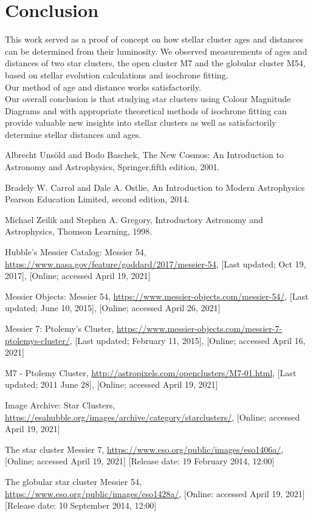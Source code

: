 \documentclass[12pt]{article}
\begin{document}
		\section{Conclusion}
		This work served as a proof of concept on how stellar cluster ages and distances can be determined from their luminosity. We observed measurements of ages and distances of two star clusters, the open cluster M7 and the globular cluster M54, based on stellar evolution calculations and isochrone fitting.\\
		Our method of age and distance works satisfactorily.\\
		Our overall conclusion is that studying star clusters using Colour Magnitude Diagrams and with appropriate theoretical methods of isochrone fitting can provide valuable new insights into stellar clusters as well as satisfactorily determine stellar distances and ages.
		
	\pagebreak
	\begin{thebibliography}{}
		
		{Albrecht Uns\"{o}ld and Bodo Baschek},
		{The New Cosmos: An Introduction to Astronomy and Astrophysics},
		{Springer},{fifth edition}, 2001.
		
		{Bradely W. Carrol and Dale A. Ostlie},
		{An Introduction to Modern Astrophysics}
		{Pearson Education Limited},
		{second edition}, 2014.
		
		{Michael Zeilik and Stephen A. Gregory},
		{Introductory Astronomy and Astrophysics},
		{Thomson Learning}, 1998.
		
		{Hubble's Messier Catalog: Messier 54},
		{\url{https://www.nasa.gov/feature/goddard/2017/messier-54}},
		{[Last updated; Oct 19, 2017]},
		{[Online; accessed April 19, 2021]}
		
		{Messier Objects: Messier 54},
		{\url{https://www.messier-objects.com/messier-54/}},
		{[Last updated; June 10, 2015]},
		{[Online; accessed April 26, 2021]}
		
		{Messier 7: Ptolemy's Cluster},
		{\url{https://www.messier-objects.com/messier-7-ptolemys-cluster/}},
		{[Last updated; February 11, 2015]},
		{[Online; accessed April 16, 2021]}
		
		{M7 - Ptolemy Cluster},
		{\url{http://astropixels.com/openclusters/M7-01.html}},
		{[Last updated; 2011 June 28]},
		{[Online; accessed April 19, 2021]}
		
		{Image Archive: Star Clusters},
		{\url{https://esahubble.org/images/archive/category/starclusters/}},
		{[Online; accessed April 19, 2021]}
		
		{The star cluster Messier 7},
		{\url{https://www.eso.org/public/images/eso1406a/}},
		{[Online; accessed April 19, 2021]}
		{[Release date: 19 February 2014, 12:00]}
		
		{The globular star cluster Messier 54},
		{\url{https://www.eso.org/public/images/eso1428a/}},
		{[Online: accessed April 19, 2021]}
		{[Release date: 10 September 2014, 12:00]}
		
	\end{thebibliography}
\end{document}
